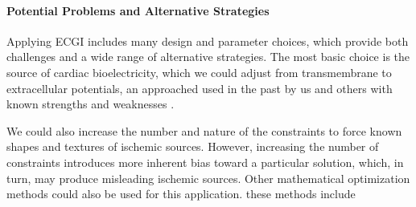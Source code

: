 \paragraph{Potential Problems and Alternative Strategies} Applying ECGI
includes many design and parameter choices, which provide both challenges
and a wide range of alternative strategies. The most basic choice is the
source of cardiac bioelectricity, which we could adjust from transmembrane
to extracellular potentials, an approached used in the past by us and
others with known strengths and weaknesses \cite{RSM:Mac95,RSM:Ost97b}.

 We could also increase the number and nature of the constraints to force known
shapes and textures of ischemic sources. However, increasing the number of
constraints introduces more inherent bias toward a particular solution,
which, in turn, may produce misleading ischemic sources. Other mathematical
optimization methods could also be used for this
application\cite{RSM:Ahm94,RSM:Bro96b,RSM:Ahm98,
  RSM:Gha2001,RSM:Ost92,RSM:Ost97c,RSM:Ram2003,RSM:Clu2018}. these methods include


